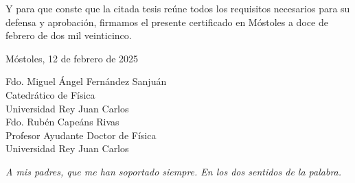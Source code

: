 \documentclass[a4paper,12pt,nofootinbib]{newsiambook}
\newcommand{\clearemptydoublepage}{\newpage{\pagestyle{empty}\cleardoublepage}}
\newcommand{\dedica}{\sffamily \slshape}
\begin{document}
Y para que conste que la citada tesis reúne todos los requisitos necesarios para su defensa y aprobación, firmamos el presente certificado en Móstoles a doce de febrero de dos mil veinticinco.

\vspace*{1cm}

\raggedleft
Móstoles, 12 de febrero de 2025

\centering


\vspace*{3.5cm}


\begin{multicols}{2}
Fdo. Miguel Ángel Fernández Sanjuán \\ Catedrático de Física \\ Universidad Rey Juan Carlos\\ 
\columnbreak
Fdo. Rubén Capeáns Rivas \\ Profesor Ayudante Doctor de Física \\ Universidad Rey Juan Carlos
\end{multicols}



\justifying

\clearemptydoublepage

\thispagestyle{empty}

\begin{flushright}

\begin{minipage}[t][5cm][b]{0,5\textwidth}

{\dedica \large A mis padres, que me han soportado siempre. En los dos sentidos de la palabra.}

\end{minipage}
\end{flushright}

\clearemptydoublepage



 


\clearemptydoublepage



\setcounter{chapter}{0}





\clearemptydoublepage

\tableofcontents \clearemptydoublepage

\end{document}
